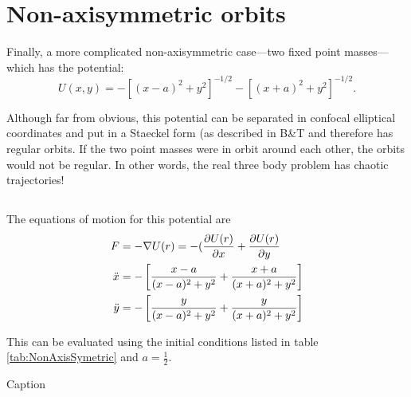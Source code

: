 \section{Non-axisymmetric orbits}

Finally, a more complicated non-axisymmetric case—two fixed point
masses—which has the potential:
\begin{equation}
    U(x,y) = -[(x-a)^2 +y^2]^{-1/2} -[(x+a)^2 +y^2]^{-1/2}.
\end{equation}

Although far from obvious, this potential can be separated in confocal
elliptical coordinates and put in a Staeckel form (as described in B\&T
and therefore has regular orbits. If the two point masses were in orbit
around each other, the orbits would not be regular. In other words, the
real three body problem has chaotic trajectories!
\subsection{}

The equations of motion for this potential are
\begin{align*}
    F&=-\nabla U(r) =-(\frac{\partial U(r)}{\partial x}+\frac{\partial U(r)}{\partial y}\\
    \Ddot{x}&=-\left[\frac{x-a}{(x-a)^2+y^2}+\frac{x+a}{(x+a)^2+y^2}\right] \\
    \Ddot{y}&=- \left[\frac{y}{(x-a)^2+y^2}+\frac{y}{(x+a)^2+y^2}\right]
\end{align*}

This can be evaluated using the initial conditions listed in table \ref{tab:NonAxisSymetric} and $a= \frac{1}{2}$.


\begin{table}[]
    \centering

    \caption{Caption}
    \label{tab:ToomreOrbitIV}
\end{table}

